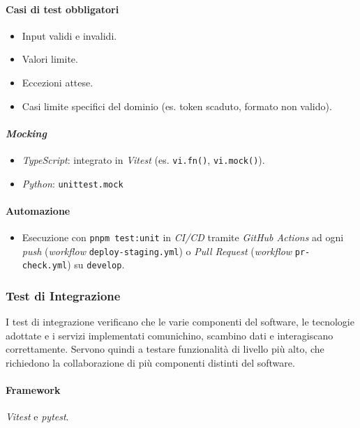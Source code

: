 \documentclass[12pt, a4paper]{article}
\begin{document}
\paragraph{Casi di test obbligatori}
\begin{itemize}
    \item Input validi e invalidi.
    \item Valori limite.
    \item Eccezioni attese.
    \item Casi limite specifici del dominio (es. token scaduto, formato non valido).
\end{itemize}

\paragraph{\textit{Mocking}}
\begin{itemize}
    \item \textit{TypeScript}: integrato in \textit{Vitest} (es. \texttt{vi.fn()}, \texttt{vi.mock()}).
    \item \textit{Python}: \texttt{unittest.mock}
\end{itemize}

\paragraph{Automazione}
\begin{itemize}
    \item Esecuzione con \texttt{pnpm test:unit} in \textit{CI/CD} tramite \textit{GitHub Actions} ad ogni \textit{push} (\textit{workflow} \texttt{deploy-staging.yml}) o \textit{Pull Request} (\textit{workflow} \texttt{pr-check.yml}) su \texttt{develop}.
\end{itemize}

\newpage
\subsubsection{Test di Integrazione}

I test di integrazione verificano che le varie componenti del software, le tecnologie adottate e i servizi implementati comunichino, scambino dati e interagiscano correttamente. Servono quindi a testare funzionalità di livello più alto, che richiedono la collaborazione di più componenti distinti del software.

\paragraph{Framework} \textit{Vitest} e \textit{pytest}.
\end{document}
